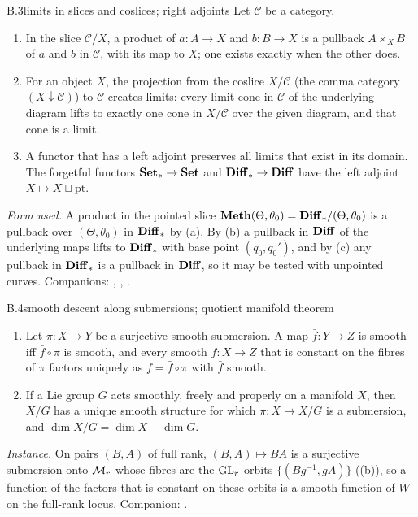 \begin{auxresult}{B.3}{limits in slices and coslices; right adjoints}{\citep[\S III.4, \S V.1 Exercise~1, \S V.5
Thm~1]{xmaclane1998categories}}
Let $\mathcal C$ be a category.
\begin{enumerate}[label=(\alph*)]
  \item In the slice $\mathcal C/X$, a product of $a:A\to X$ and $b:B\to X$ is a pullback $A\times_XB$ of $a$ and $b$
    in $\mathcal C$, with its map to $X$; one exists exactly when the other does.
  \item For an object $X$, the projection from the coslice $X/\mathcal C$ (the comma category $(X\downarrow\mathcal C)$)
    to $\mathcal C$ creates limits: every limit cone in $\mathcal C$ of the underlying diagram lifts to exactly one cone
    in $X/\mathcal C$ over the given diagram, and that cone is a limit.
  \item A functor that has a left adjoint preserves all limits that exist in its domain. The forgetful functors
    $\mathbf{Set}_*\to\mathbf{Set}$ and $\mathbf{Diff}_*\to\mathbf{Diff}$ have the left adjoint $X\mapsto X\sqcup\mathrm{pt}$.
\end{enumerate}
\end{auxresult}
\noindent\emph{Form used.} A product in the pointed slice $\mathbf{Meth}(\Theta,\theta_0)=\mathbf{Diff}_*/(\Theta,\theta_0)$ is a
pullback over $(\Theta,\theta_0)$ in $\mathbf{Diff}_*$ by (a). By (b) a pullback in $\mathbf{Diff}$ of the underlying maps lifts to
$\mathbf{Diff}_*$ with base point $(q_0,q_0')$, and by (c) any pullback in $\mathbf{Diff}_*$ is a pullback in $\mathbf{Diff}$, so it may be
tested with unpointed curves. Companions: , , .

\begin{auxresult}{B.4}{smooth descent along submersions; quotient manifold theorem}{\citep[Thms~4.29, 4.30,
21.10]{xlee2013introduction}}
\begin{enumerate}[label=(\alph*)]
  \item Let $\pi:X\to Y$ be a surjective smooth submersion. A map $\bar f:Y\to Z$ is smooth iff $\bar f\circ\pi$ is
    smooth, and every smooth $f:X\to Z$ that is constant on the fibres of $\pi$ factors uniquely as $f=\bar f\circ\pi$
    with $\bar f$ smooth.
  \item If a Lie group $G$ acts smoothly, freely and properly on a manifold $X$, then $X/G$ has a unique smooth structure
    for which $\pi:X\to X/G$ is a submersion, and $\dim X/G=\dim X-\dim G$.
\end{enumerate}
\end{auxresult}
\noindent\emph{Instance.} On pairs $(B,A)$ of full rank, $(B,A)\mapsto BA$ is a surjective submersion onto $\mathcal{M}_r$ whose
fibres are the $\mathrm{GL}_r$-orbits $\{(Bg^{-1},gA)\}$ ((b)), so a function of the factors that is constant on
these orbits is a smooth function of $W$ on the full-rank locus. Companion: .

